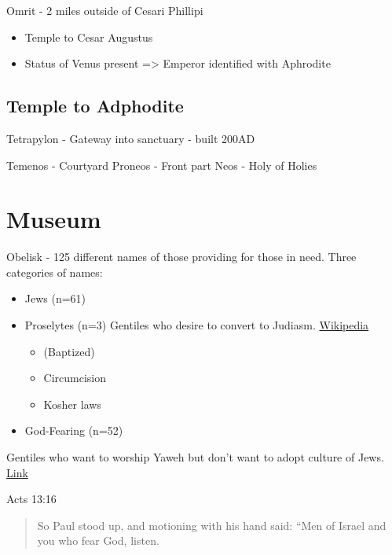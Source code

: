 \documentclass[
]{book}
\providecommand{\tightlist}{%
  \setlength{\itemsep}{0pt}\setlength{\parskip}{0pt}}
\begin{document}
Omrit - 2 miles outside of Cesari Phillipi

\begin{itemize}
\tightlist
\item
  Temple to Cesar Augustus
\item
  Status of Venus present
  =\textgreater{} Emperor identified with Aphrodite
\end{itemize}

\hypertarget{temple-to-adphodite}{%
\section{Temple to Adphodite}\label{temple-to-adphodite}}

Tetrapylon - Gateway into sanctuary - built 200AD

Temenos - Courtyard
Proneos - Front part
Neos - Holy of Holies

\hypertarget{museum}{%
\chapter{Museum}\label{museum}}

Obelisk - 125 different names of those providing for those in need.
Three categories of names:

\begin{itemize}
\item
  Jews (n=61)
\item
  Proselytes (n=3) Gentiles who desire to convert to Judiasm. \href{https://en.wikipedia.org/wiki/Proselyte}{Wikipedia}

  \begin{itemize}
  \tightlist
  \item
    (Baptized)
  \item
    Circumcision
  \item
    Kosher laws
  \end{itemize}
\item
  God-Fearing (n=52)
\end{itemize}

Gentiles who want to worship Yaweh but don't want to adopt culture of Jews. \href{https://www.biblestudymagazine.com/bible-study-magazine-blog/2016/6/3/who-were-the-god-fearers}{Link}

Acts 13:16

\begin{quote}
So Paul stood up, and motioning with his hand said:
``Men of Israel and you who fear God, listen.
\end{quote}
\end{document}
